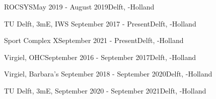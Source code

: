 \begin{rSection}{}
  \begin{experienceItem}
    {ROCSYS}{May 2019 - August 2019}{}{Delft, -Holland}
  \end{experienceItem}

  \begin{experienceItem}
    {TU Delft, 3mE, IWS }{September 2017 - Present}{}{Delft, -Holland}
  \end{experienceItem}

  \begin{experienceItem}
    {Sport Complex X}{September 2021 - Present}{}{Delft, -Holland}
  \end{experienceItem}

\end{rSection}


\begin{rSection}{}
  \begin{experienceItem}{Virgiel, OHC}{September 2016 - September 2017}{}{Delft, -Holland}
  \end{experienceItem}

  \begin{experienceItem}{Virgiel, Barbara's }{September 2018 - September 2020}{}{Delft, -Holland}
  \end{experienceItem}

  \begin{experienceItem}
    {TU Delft, 3mE, }{September 2020 - September 2021}{}{Delft, -Holland}
  \end{experienceItem}

\end{rSection}

